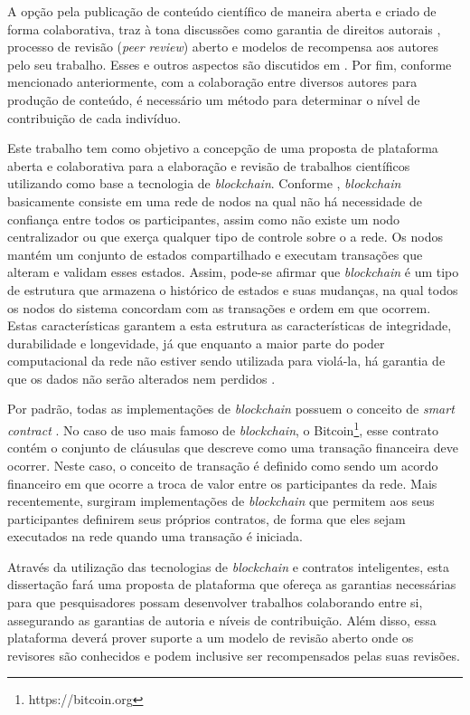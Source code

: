 A opção pela publicação de conteúdo científico de maneira aberta e criado de forma colaborativa, traz à tona discussões como garantia de direitos autorais \cite{OpenAccessCopyright2006}, processo de revisão (\textit{peer review}) aberto e modelos de recompensa aos autores pelo seu trabalho. Esses e outros aspectos são discutidos em \cite{OpenAccessAnalysis2004}. Por fim, conforme mencionado anteriormente, com a colaboração entre diversos autores para produção de conteúdo, é necessário um método para determinar o nível de contribuição de cada indivíduo.

Este trabalho tem como objetivo a concepção de uma proposta de plataforma aberta e colaborativa para a elaboração e revisão de trabalhos científicos utilizando como base a tecnologia de \textit{blockchain}. Conforme \cite{UntanglingBlockchain2017},  \textit{blockchain} basicamente consiste em uma rede de nodos na qual não há necessidade de confiança entre todos os participantes, assim como não existe um nodo centralizador ou que exerça qualquer tipo de controle sobre o a rede. Os nodos mantém um conjunto de estados compartilhado e executam transações que alteram e validam esses estados. Assim, pode-se afirmar que \textit{blockchain} é um tipo de estrutura que armazena o histórico de estados e suas mudanças, na qual todos os nodos do sistema concordam com as transações e ordem em que ocorrem. Estas características garantem a esta estrutura as características de integridade, durabilidade e longevidade, já que enquanto a maior parte do poder computacional da rede não estiver sendo utilizada para violá-la, há garantia de que os dados não serão alterados nem perdidos \cite{Bitcoin2008}.

Por padrão, todas as implementações de \textit{blockchain} possuem o conceito de \textit{smart contract} \cite{SmartContract2017}. No caso de uso mais famoso de \textit{blockchain}, o Bitcoin\footnote{https://bitcoin.org}, esse contrato contém o conjunto de cláusulas que descreve como uma transação financeira deve ocorrer. Neste caso, o conceito de transação é definido como sendo um acordo financeiro em que ocorre a troca de valor entre os participantes da rede. Mais recentemente, surgiram implementações de \textit{blockchain} que permitem aos seus participantes definirem seus próprios contratos, de forma que eles sejam executados na rede quando uma transação é iniciada.

Através da utilização das tecnologias de \textit{blockchain} e contratos inteligentes, esta dissertação fará uma proposta de plataforma que ofereça as garantias necessárias para que pesquisadores possam desenvolver trabalhos colaborando entre si, assegurando as garantias de autoria e níveis de contribuição. Além disso, essa plataforma deverá prover suporte a um modelo de revisão aberto onde os revisores são conhecidos e podem inclusive ser recompensados pelas suas revisões.